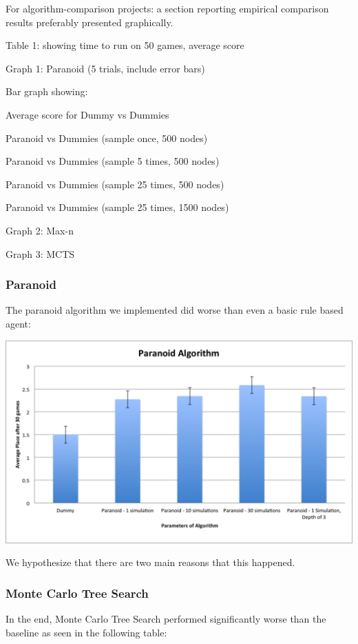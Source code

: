 \documentclass[11pt]{article}
\begin{document}
 For algorithm-comparison projects: a section reporting empirical comparison results preferably presented graphically.

Table 1: showing time to run on 50 games, average score

Graph 1: Paranoid (5 trials, include error bars)

Bar graph showing: 

Average score for Dummy vs Dummies

Paranoid vs Dummies (sample once, 500 nodes)

Paranoid vs Dummies (sample 5 times, 500 nodes)

Paranoid vs Dummies (sample 25 times, 500 nodes)

Paranoid vs Dummies (sample 25 times, 1500 nodes)

Graph 2: Max-n

Graph 3: MCTS
\subsubsection{Paranoid}

The paranoid algorithm we implemented did worse than even a basic rule based agent:

\begin{center}
\includegraphics[width=\textwidth]{Paranoid.png}
\end{center}

We hypothesize that there are two main reasons that this happened.

\subsubsection{Monte Carlo Tree Search}

In the end, Monte Carlo Tree Search performed significantly worse than the baseline as seen in the following table:
\end{document}
